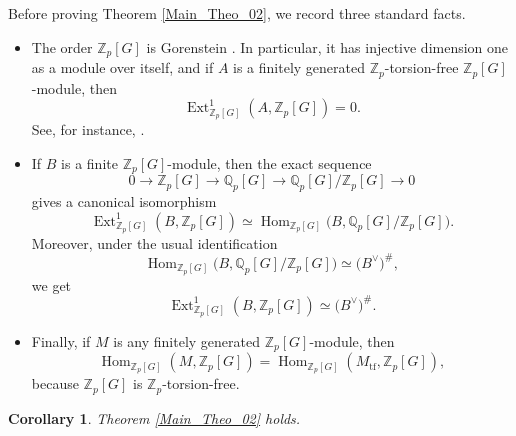 \documentclass[a4paper,11pt]{article}
\newtheorem{corollary}[theorem]{Corollary}
\begin{document}
Before proving Theorem \ref{Main_Theo_02}, we record three standard facts.
\begin{itemize}
\item The order \(\mathbb Z_p[G]\) is Gorenstein
\cite[Cor. 10.29]{CurtisReiner}. In particular, it has injective dimension
one as a module over itself, and if \(A\) is a finitely generated
\(\mathbb Z_p\)-torsion-free \(\mathbb Z_p[G]\)-module, then
\begin{equation}
\label{Gorenstein-Ext-zero}
\operatorname{Ext}_{\mathbb Z_p[G]}^{1}(A,\mathbb Z_p[G])=0.
\end{equation}
See, for instance, \cite[\S A.3, (b), and (A.7)]{BS19}.

\item If \(B\) is a finite \(\mathbb Z_p[G]\)-module, then the exact sequence
\[
0\to
\mathbb Z_p[G]
\to
\mathbb Q_p[G]
\to
\mathbb Q_p[G]/\mathbb Z_p[G]
\to 0
\]
gives a canonical isomorphism
\[
\operatorname{Ext}_{\mathbb Z_p[G]}^{1}(B,\mathbb Z_p[G])
\simeq
\operatorname{Hom}_{\mathbb Z_p[G]}
\bigl(B,\mathbb Q_p[G]/\mathbb Z_p[G]\bigr).
\]
Moreover, under the usual identification
\[
\operatorname{Hom}_{\mathbb Z_p[G]}
\bigl(B,\mathbb Q_p[G]/\mathbb Z_p[G]\bigr)
\simeq
\bigl(B^\vee\bigr)^\#,
\]
we get
\begin{equation}
\label{Gorenstein-Ext-dual}
\operatorname{Ext}_{\mathbb Z_p[G]}^{1}(B,\mathbb Z_p[G])
\simeq
\bigl(B^\vee\bigr)^\#.
\end{equation}

\item Finally, if \(M\) is any finitely generated \(\mathbb Z_p[G]\)-module,
then
\begin{equation}
\label{Hom-torsion-free-quotient}
\operatorname{Hom}_{\mathbb Z_p[G]}(M,\mathbb Z_p[G])
=
\operatorname{Hom}_{\mathbb Z_p[G]}(M_{\mathrm{tf}},\mathbb Z_p[G]),
\end{equation}
because \(\mathbb Z_p[G]\) is \(\mathbb Z_p\)-torsion-free.
\end{itemize}
\begin{corollary}
Theorem \ref{Main_Theo_02} holds.
\end{corollary}
\end{document}
